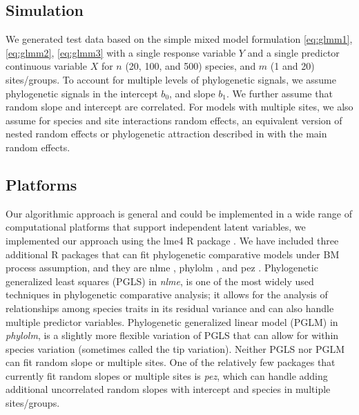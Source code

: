 \subsection{Simulation}

We generated test data based on the simple mixed model formulation \ref{eq:glmm1}, \ref{eq:glmm2}, \ref{eq:glmm3} with a single response variable $Y$ and a single predictor continuous variable $X$ for $n$ (20, 100, and 500) species, and $m$ (1 and 20) sites/groups. 
To account for multiple levels of phylogenetic signals, we assume phylogenetic signals in the intercept $b_0$, and slope $b_1$.
We further assume that random slope and intercept are correlated. 
For models with multiple sites, we also assume for species and site interactions random effects, an equivalent version of nested random effects or phylogenetic attraction described in \cite{helmus2007separating} with the main random effects.

\subsection{Platforms}

Our algorithmic approach is general and could be implemented in a wide range of computational platforms that support independent latent variables, we implemented our approach using the lme4 R package \citep{bates2015fitting}.
We have included three additional R packages that can fit phylogenetic comparative models under BM process assumption, and they are nlme \citep{pinheiro2014r}, phylolm \citep{ho2014phylolm}, and pez \citep{pearse2015pez}.
Phylogenetic generalized least squares (PGLS) in \textit{nlme}, is one of the most widely used techniques in phylogenetic comparative analysis; it allows for the analysis of relationships among species traits in its residual variance and can also handle multiple predictor variables.
Phylogenetic generalized linear model (PGLM) in \textit{phylolm}, is a slightly more flexible variation of PGLS that can allow for within species variation (sometimes called the tip variation). 
Neither PGLS nor PGLM can fit random slope or multiple sites. 
One of the relatively few packages that currently fit random slopes or multiple sites is \textit{pez}, which can handle adding additional uncorrelated random slopes with intercept and species in multiple sites/groups.  



